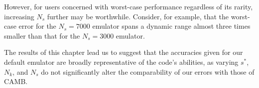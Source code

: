 However, for users concerned with worst-case performance regardless of its
rarity, increasing $N_s$ further may be worthwhile. Consider, for example,
that the worst-case error for the $N_s = 7000$ emulator spans a dynamic range
almost three times smaller than that for the $N_s = 3000$ emulator.

The results of this chapter lead us to suggest that the accuracies given for
our default emulator are broadly representative of the code's abilities, as
varying $s^*$, $N_k$, and $N_s$ do not significantly alter the comparability
of our errors with those of CAMB.
